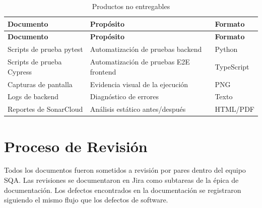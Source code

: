 \begin{longtable}{lp{6cm}p{4cm}}
\caption{Productos no entregables}
\label{tab:no-entregables}\\
\toprule
\textbf{Documento} & \textbf{Propósito} & \textbf{Formato}\\
\midrule
\endfirsthead
\toprule
\textbf{Documento} & \textbf{Propósito} & \textbf{Formato}\\
\midrule
\endhead
\bottomrule
\endfoot

Scripts de prueba pytest & Automatización de pruebas backend & Python\\

Scripts de prueba Cypress & Automatización de pruebas E2E frontend & TypeScript\\

Capturas de pantalla & Evidencia visual de la ejecución & PNG\\

Logs de backend & Diagnóstico de errores & Texto\\

Reportes de SonarCloud & Análisis estático antes/después & HTML/PDF\\

\end{longtable}

\section{Proceso de Revisión}
\label{sec:revision-docs}

Todos los documentos fueron sometidos a revisión por pares dentro del equipo SQA. Las revisiones se documentaron en Jira como subtareas de la épica de documentación. Los defectos encontrados en la documentación se registraron siguiendo el mismo flujo que los defectos de software.
